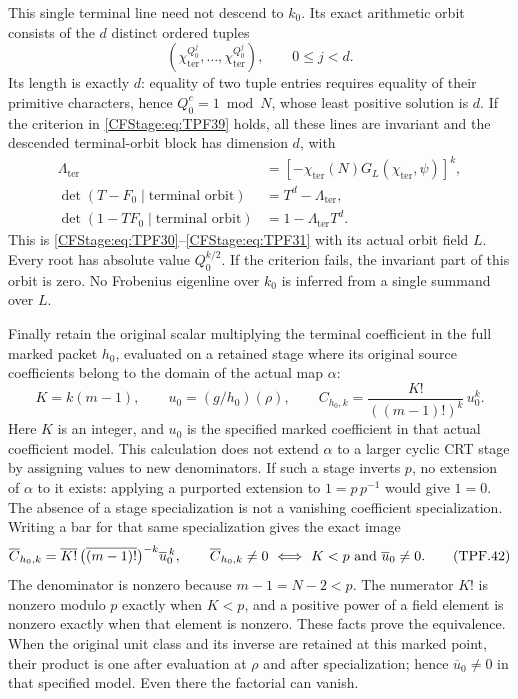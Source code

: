 This single terminal line need not descend to
\(k_0\). Its exact arithmetic orbit consists of
the \(d\) distinct ordered tuples
\[
 \left(\chi_{\mathrm{ter}}^{Q_0^j},\ldots,
             \chi_{\mathrm{ter}}^{Q_0^j}\right),
             \qquad 0\le j<d.
\]
Its length is exactly \(d\): equality of two
tuple entries requires equality of their primitive
characters, hence \(Q_0^e=1\bmod N\), whose least
positive solution is \(d\).
If the criterion in \eqref{CFStage:eq:TPF39} holds, all
these lines are invariant and the descended
terminal-orbit block has dimension \(d\), with
\[
 \begin{split}
 \Lambda_{\mathrm{ter}}
   &=\left[-\chi_{\mathrm{ter}}(N)
                    G_L(\chi_{\mathrm{ter}},\psi)\right]^k,\\
 \det(T-F_0\mid\text{terminal orbit})
   &=T^d-\Lambda_{\mathrm{ter}},\\
 \det(1-TF_0\mid\text{terminal orbit})
   &=1-\Lambda_{\mathrm{ter}}T^d .
 \end{split}
 \tag{TPF.40}\label{CFStage:eq:TPF40}
\]
This is \eqref{CFStage:eq:TPF30}--\eqref{CFStage:eq:TPF31} with
its actual orbit field \(L\). Every root has
absolute value \(Q_0^{k/2}\).
If the criterion fails, the invariant part of
this orbit is zero. No Frobenius eigenline over
\(k_0\) is inferred from a single summand over \(L\).

Finally retain the original scalar multiplying
the terminal coefficient in the full marked
packet \(h_0\), evaluated on a retained stage
where its original source coefficients belong
to the domain of the actual map \(\alpha\):
\[
 K=k(m-1),\qquad
 u_0=(g/h_0)(\rho),\qquad
 C_{h_0,k}=
        \frac{K!}{((m-1)!)^k}\,u_0^k .
 \tag{TPF.41}\label{CFStage:eq:TPF41}
\]
Here \(K\) is an integer, and \(u_0\) is the
specified marked coefficient in that actual
coefficient model. This calculation does not
extend \(\alpha\) to a larger cyclic CRT stage
by assigning values to new denominators.
If such a stage inverts \(p\), no extension
of \(\alpha\) to it exists: applying a purported
extension to \(1=p\,p^{-1}\) would give \(1=0\).
The absence of a stage specialization is not
a vanishing coefficient specialization.
Writing a bar for that same specialization gives
the exact image
\[
 \overline{C}_{h_0,k}
  =\overline{K!}\,
       \bigl(\overline{(m-1)!}\bigr)^{-k}
                           \overline u_0^{\,k},\qquad
 \overline C_{h_0,k}\ne0
    \ \Longleftrightarrow\
           K<p\ \hbox{and }\overline u_0\ne0 .
 \tag{TPF.42}\label{CFStage:eq:TPF42}
\]
The denominator is nonzero because \(m-1=N-2<p\).
The numerator \(K!\) is nonzero modulo \(p\)
exactly when \(K<p\), and a positive power of a
field element is nonzero exactly when that
element is nonzero. These facts prove the
equivalence. When the original unit class and
its inverse are retained at this marked point,
their product is one after evaluation at
\(\rho\) and after specialization; hence
\(\overline u_0\ne0\) in that specified model.
Even there the factorial can vanish.

